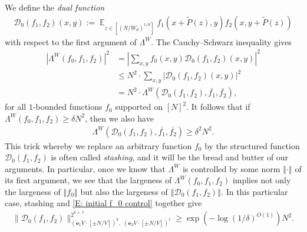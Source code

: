 \documentclass[11pt]{amsart}
\theoremstyle{definition}
\DeclareMathOperator*{\E}{\mathbb{E}}
\newcommand{\CD}{{\mathcal D}}
\newcommand{\be}{{\mathbf{e}}}
\newcommand{\norm}[1]{\left\Vert #1\right\Vert}
\newcommand{\abs}[1]{\mathopen{}\left| #1\mathclose{}\right|}
\begin{document}
 We define the \emph{dual function}
\begin{align*}
    \CD_0(f_1,f_2)(x,y) := \E_{z \in [(N/W_d)^{1/d}]} f_1(x+\widetilde{P}(z),y)f_2(x,y+\widetilde{P}(z))
\end{align*}
with respect to the first argument of $\Lambda^W$.  The Cauchy--Schwarz inequality gives 
\begin{align*}
    |\Lambda^W(f_0,f_1,f_2)|^2 &= \abs{\sum_{x,y}f_0(x,y)\CD_0(f_1,f_2)(x,y)}^2\\
    &\leq N^2\cdot\sum_{x,y}|\CD_0(f_1,f_2)(x,y)|^2\\
    &= N^2\cdot \Lambda^W(\CD_0(f_1, f_2),\overline{f_1},\overline{f_2}),
\end{align*}
for all $1$-bounded functions $f_0$ supported on $[N]^2$.  It follows that if $\Lambda^W(f_0,f_1,f_2) \geq \delta N^2$, then we also have
\begin{align*}
    \Lambda^W(\CD_0(f_1, f_2),\overline{f_1},\overline{f_2}) \geq \delta^2 N^2.
\end{align*}
This trick whereby we replace an arbitrary function $f_0$ by the structured function $\CD_0(f_1, f_2)$ is often called \textit{stashing}, and it will be the bread and butter of our arguments.
In particular, once we know that $\Lambda^W$ is controlled by some norm $\norm{\cdot}$ of its first argument, we see that the largeness of $\Lambda^W(f_0,f_1,f_2)$ implies not only the largeness of $\norm{f_0}$ but also the largeness of $\norm{\CD_0(f_1,f_2)}$.
In this particular case, stashing and \eqref{E: initial f_0 control} together give
\begin{align}\label{E: D_0 control}
        \|\CD_0(f_1, f_2)\|_{(\be_1V \cdot [\pm N/V])^k,\; (\be_2 V \cdot [\pm N/V])^\ell}^{2^{k+\ell}} \geq \exp(-\log(1/\delta)^{O(1)}) N^2.
\end{align}
\end{document}
